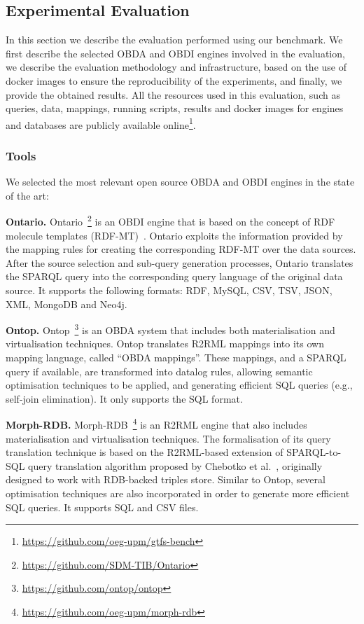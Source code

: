 \subsection{Experimental Evaluation}
In this section we describe the evaluation performed using our benchmark. We first describe the selected OBDA and OBDI engines involved in the evaluation, we describe the evaluation methodology and infrastructure, based on the use of docker images to ensure the reproducibility of the experiments, and finally, we provide the obtained results. All the resources used in this evaluation, such as queries, data, mappings, running scripts, results and docker images for engines and databases are publicly available online\footnote{\url{https://github.com/oeg-upm/gtfs-bench}}.

\subsubsection{Tools}

We selected the most relevant open source OBDA and OBDI engines in the state of the art: 

\noindent\textbf{Ontario.} Ontario~\citep{endris2019ontario}\footnote{\url{https://github.com/SDM-TIB/Ontario}} is an OBDI engine that is based on the concept of RDF molecule templates (RDF-MT)~\citep{endris2017mulder}. Ontario exploits the information provided by the mapping rules for creating the corresponding RDF-MT over the data sources. After the source selection and sub-query generation processes, Ontario translates the SPARQL query into the corresponding query language of the original data source. It supports the following formats: RDF, MySQL, CSV, TSV, JSON, XML, MongoDB and Neo4j.

\noindent\textbf{Ontop.} Ontop~\citep{rodriguez2015efficient}\footnote{\url{https://github.com/ontop/ontop}} is an OBDA system that includes both materialisation and virtualisation techniques. Ontop translates R2RML mappings into its own mapping language, called ``OBDA mappings''. These mappings, and a SPARQL query if available, are transformed into datalog rules, allowing semantic optimisation techniques to be applied, and generating efficient SQL queries (e.g., self-join elimination). It only supports the SQL format.

\noindent\textbf{Morph-RDB.} Morph-RDB~\citep{priyatna2014formalisation}\footnote{\url{https://github.com/oeg-upm/morph-rdb}} is an R2RML engine that also includes materialisation and virtualisation techniques. The formalisation of its query translation technique is based on the R2RML-based extension of SPARQL-to-SQL query translation algorithm proposed by Chebotko et al.~\citep{chebotko2009semantics}, originally designed to work with RDB-backed triples store. Similar to Ontop, several optimisation techniques are also incorporated in order to generate more efficient SQL queries. It supports SQL and CSV files.

